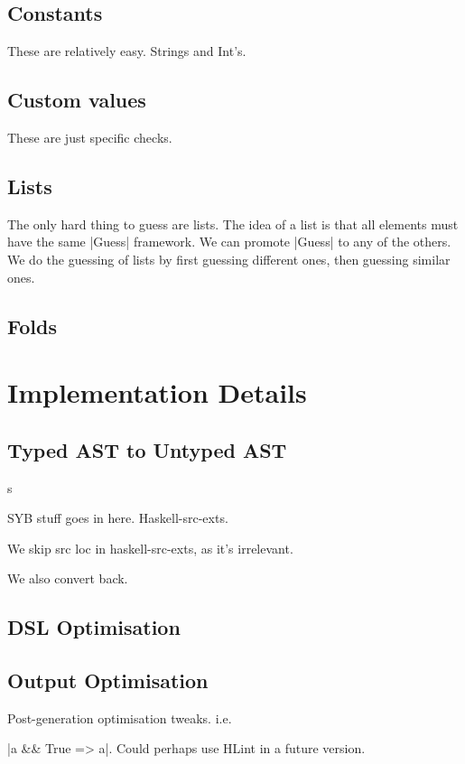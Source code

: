 \documentclass[preprint,draft]{sigplanconf}
\begin{document}
\subsection{Constants}

These are relatively easy. Strings and Int's.

\subsection{Custom values}

These are just specific checks.

\subsection{Lists}

The only hard thing to guess are lists. The idea of a list is that all elements must have the same |Guess| framework. We can promote |Guess| to any of the others. We do the guessing of lists by first guessing different ones, then guessing similar ones.

\subsection{Folds}


\section{Implementation Details}
\label{sec:implementation}

\subsection{Typed AST to Untyped AST}s
\label{sec:universe}

SYB stuff goes in here. Haskell-src-exts.

We skip src loc in haskell-src-exts, as it's irrelevant.

We also convert back.

\subsection{DSL Optimisation}

\subsection{Output Optimisation}
\label{sec:simplify}

Post-generation optimisation tweaks. i.e. \ignore|a && True => a|. Could perhaps use HLint in a future version.
\end{document}
